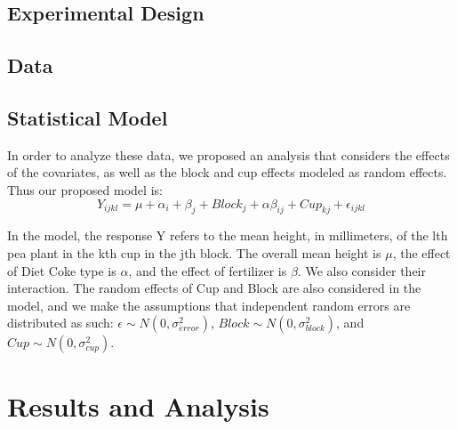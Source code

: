 \documentclass[preprint,12pt]{elsarticle}\usepackage[]{graphicx}\usepackage[]{color}
\begin{document}
\subsection{Experimental Design}

\subsection{Data}

\subsection{Statistical Model}
In order to analyze these data, we proposed an analysis that considers the effects of the covariates, as well as the block and cup effects modeled as random effects. Thus our proposed model is: 
\begin{equation*}
Y_{ijkl} = \mu + \alpha_i + \beta_j + Block_j + \alpha\beta_{ij}+ Cup_{kj} + \epsilon_{ijkl}
\end{equation*}

In the model, the response Y refers to the mean height, in millimeters, of the lth pea plant in the kth cup in the jth block. The overall mean height is $\mu$, the effect of Diet Coke type is $\alpha$, and the effect of fertilizer is $\beta$. We also consider their interaction. The random effects of Cup and Block are also considered in the model, and we make the assumptions that independent random errors are distributed as such: $\epsilon \sim N(0,\sigma^2_{error})$, $Block \sim N(0,\sigma^2_{block})$, and $Cup \sim N(0,\sigma^2_{cup})$. 





\section{Results and Analysis}
\end{document}
